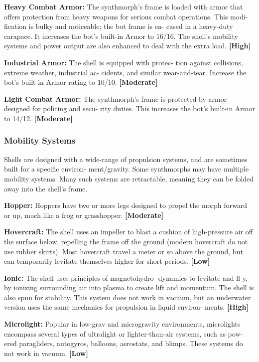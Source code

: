 \textbf{Heavy Combat Armor:} The synthmorph's frame is 
loaded with armor that offers protection from heavy 
weapons for serious combat operations. This modi-
fication is bulky and noticeable; the bot frame is en-
cased in a heavy-duty carapace. It increases the bot's 
built-in Armor to 16/16. The shell's mobility systems 
and power output are also enhanced to deal with the 
extra load. \textbf{[High]}

\textbf{Industrial Armor:} The shell is equipped with protec-
tion against collisions, extreme weather, industrial ac-
cidents, and similar wear-and-tear. Increase the bot's 
built-in Armor rating to 10/10. \textbf{[Moderate]}

\textbf{Light Combat Armor:} The synthmorph's frame is 
protected by armor designed for policing and secu-
rity duties. This increases the bot's built-in Armor to 
14/12. \textbf{[Moderate]}

\subsubsection{Mobility Systems}

Shells are designed with a wide-range of propulsion 
systems, and are sometimes built for a specific environ-
ment/gravity. Some synthmorphs may have multiple 
mobility systems. Many such systems are retractable, 
meaning they can be folded away into the shell's frame.

\textbf{Hopper:} Hoppers have two or more legs designed 
to propel the morph forward or up, much like a frog 
or grasshopper. \textbf{[Moderate]}

\textbf{Hovercraft:} The shell uses an impeller to blast a 
cushion of high-pressure air off the surface below, 
repelling the frame off the ground (modern hovercraft 
do not use rubber skirts). Most hovercraft travel a 
meter or so above the ground, but can temporarily 
levitate themselves higher for short periods. \textbf{[Low]}

\textbf{Ionic:} The shell uses principles of magnetohydro-
dynamics to levitate and fl y, by ionizing surrounding 
air into plasma to create lift and momentum. The 
shell is also spun for stability. This system does not 
work in vacuum, but an underwater version uses the 
same mechanics for propulsion in liquid environ-
ments. \textbf{[High]}

\textbf{Microlight:} Popular in low-grav and microgravity 
environments, microlights encompass several types 
of ultralight or lighter-than-air systems, such as pow-
ered paragliders, autogyros, balloons, aerostats, and 
blimps. These systems do not work in vacuum. \textbf{[Low]}

